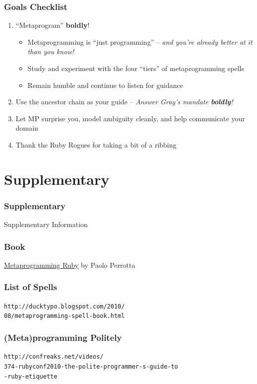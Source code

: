 \documentclass[slidestop,compress,mathserif]{beamer}
\begin{document}
\begin{frame}
	\frametitle{Goals Checklist}
	\begin{enumerate}
		\item ``Metaprogram'' \textbf{boldly}!
		\begin{itemize}
			\pause
			\item Metaprogramming is ``just programming'' -- \emph{and you're already better at it than you know!}
			\pause
			\item Study and experiment with the four ``tiers'' of metaprogramming spells
			\pause
			\item Remain humble and continue to listen for guidance
		\end{itemize}
		\pause
		\item Use the ancestor chain as your guide -- \emph{Answer Gray's mandate \textbf{boldly}!}
		\pause
		\item Let MP surprise you, model ambiguity cleanly, and help communicate your domain
		\pause
		\item Thank the Ruby Rogues for taking a bit of a ribbing
	\end{enumerate}
\end{frame}

\section{Supplementary} %
\label{sec:supplementary}

\begin{frame}
	\frametitle{Supplementary}
	\begin{center}
		Supplementary Information
	\end{center}
\end{frame}

\begin{frame}
	\frametitle{Book}
	\underline{Metaprogramming Ruby} by Paolo Perrotta
\end{frame}

\begin{frame}
	\frametitle{List of Spells}
	\texttt{http://ducktypo.blogspot.com/2010/\\08/metaprogramming-spell-book.html}
\end{frame}

\begin{frame}
	\frametitle{(Meta)programming Politely}
	\texttt{http://confreaks.net/videos/\\374-rubyconf2010-the-polite-programmer-s-guide-to\\-ruby-etiquette}
\end{frame}
\end{document}
